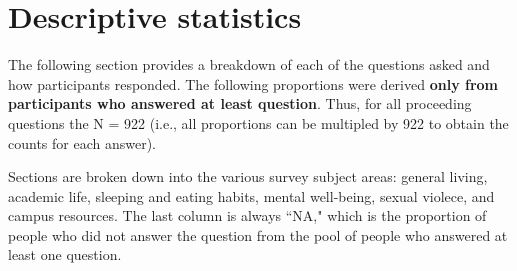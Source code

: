 \documentclass{article}\usepackage[]{graphicx}\usepackage[]{color}
\begin{document}
\pagebreak
\section{Descriptive statistics}
The following section provides a breakdown of each of the questions asked and how participants responded. The following proportions were derived \textbf{only from participants who answered at least question}. Thus, for all proceeding questions the N = 922 (i.e., all proportions can be multipled by 922 to obtain the counts for each answer).

Sections are broken down into the various survey subject areas: general living, academic life, sleeping and eating habits, mental well-being, sexual violece, and campus resources. The last column is always ``NA," which is the proportion of people who did not answer the question from the pool of people who answered at least one question.
\end{document}
